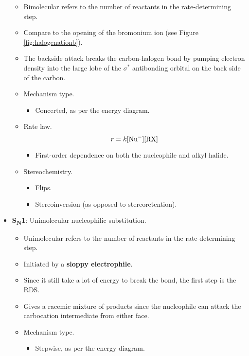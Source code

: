 \documentclass[../notes.tex]{subfiles}
\begin{document}
\begin{itemize}
\begin{itemize}
        \item Bimolecular refers to the number of reactants in the rate-determining step.
        \item Compare to the opening of the bromonium ion (see Figure \ref{fig:halogenationb}).
        \item The backside attack breaks the carbon-halogen bond by pumping electron density into the large lobe of the $\sigma^*$ antibonding orbital on the back side of the carbon.
        \item Mechanism type.
        \begin{itemize}
            \item Concerted, as per the energy diagram.
        \end{itemize}
        \item Rate law.
        \begin{equation*}
            r = k[\ce{Nu-}][\ce{RX}]
        \end{equation*}
        \begin{itemize}
            \item First-order dependence on both the nucleophile and alkyl halide.
        \end{itemize}
        \item Stereochemistry.
        \begin{itemize}
            \item Flips.
            \item Stereoinversion (as opposed to stereoretention).
        \end{itemize}
    \end{itemize}
    \item \textbf{S\textsubscript{N}1}: Unimolecular nucleophilic substitution.
    \begin{itemize}
        \item Unimolecular refers to the number of reactants in the rate-determining step.
        \item Initiated by a \textbf{sloppy electrophile}.
        \item Since it still take a lot of energy to break the  bond, the first step is the RDS.
        \item Gives a racemic mixture of products since the nucleophile can attack the carbocation intermediate from either face.
        \item Mechanism type.
        \begin{itemize}
            \item Stepwise, as per the energy diagram.

\end{itemize}
\end{itemize}
\end{itemize}
\end{document}
